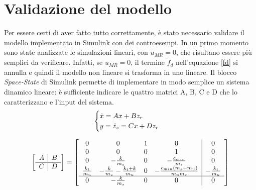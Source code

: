 \section{Validazione del modello}
Per essere certi di aver fatto tutto correttamente, è stato necessario validare il modello implementato in Simulink con dei controesempi. In un primo momento sono state analizzate le simulazioni lineari, con $u_{MR}=0$, che risultano essere più semplici da verificare. Infatti, se $u_{MR} = 0$, il termine $\tilde{f}_d$ nell'equazione \eqref{fd} si annulla e quindi il modello non lineare si trasforma in uno lineare. Il blocco \textit{Space-State} di Simulink permette di implementare in modo semplice un sistema dinamico lineare: è sufficiente indicare le quattro matrici A, B, C e D che lo caratterizzano e l'input del sistema.  
\begin{equation}
	\centering
	\begin{cases}
		\dot{x} = Ax + Bz_r\\
		y = \ddot{z}_s = Cx + Dz_r\\
	\end{cases}
	\label{sistlineare}
\end{equation}

\begin{equation}
	\left[
	\begin{array}{c|c}
		A & B\\
		\hline
		C & D\\
	\end{array}
	\right] = \left[
	\begin{array}{c c c c|c}
		0 & 0 & 1 & 0 & 0\\
		0 & 0 & 0 & 1 & 0\\
		0 & -\frac{k}{m_s} & 0 & -\frac{c_{min}}{m_s} & 0\\
		\frac{k_t}{m_u} & -\frac{k}{m_s}-\frac{k_t + k}{m_u} & 0 & -\frac{c_{min}(m_s + m_u)}{m_um_s} & -\frac{k_t}{m_u}\\
		\hline
		0 & -\frac{k}{m_s} & 0 & 0 & 0\\
	\end{array}
	\right]
\end{equation}

